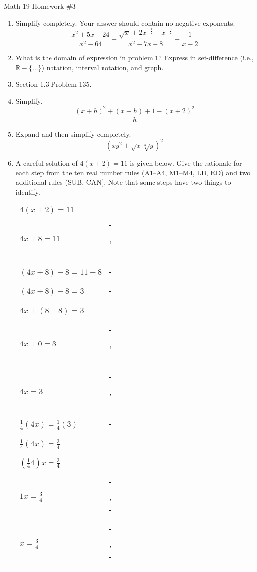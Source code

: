\documentclass[letterpaper,12pt,fleqn]{article}
\begin{document}
\begin{center}
\Large Math-19 Homework \#3
\end{center}

\vspace{0.5in}

\begin{enumerate}
\item Simplify completely.  Your answer should contain no negative exponents.
\[\frac{x^2+5x-24}{x^2-64}-
    \frac{\sqrt{x}+2x^{-\frac{1}{2}}+x^{-\frac{3}{2}}}{x^2-7x-8}+
    \frac{1}{x-2}\]

\item What is the domain of expression in problem 1? Express in set-difference
(i.e., $\mathbb{R}-\{\ldots\}$) notation, interval notation, and graph.

\item Section 1.3 Problem 135.

\item Simplify.
\[\frac{(x+h)^2+(x+h)+1-(x+2)^2}{h}\]

\item Expand and then simplify completely.
\[\left(xy^2+\sqrt{x}\sqrt[3]{y}\right)^2\]

\item A careful solution of $4(x+2)=11$ is given below. Give the rationale for
each step from the ten real number rules (A1--A4, M1--M4, LD, RD) and two
additional rules (SUB, CAN).  Note that some steps have two things to identify.

\newcommand{\fillin}{\rule{1in}{1pt}}

\begin{tabular}{ll}
$4(x+2)=11$ & \\
$4x+8=11$ & \fillin, \fillin \\
$(4x+8)-8=11-8$ & \fillin \\
$(4x+8)-8=3$ & \fillin \\
$4x+(8-8)=3$ & \fillin \\
$4x+0=3$ & \fillin, \fillin \\
$4x=3$ & \fillin, \fillin \\
$\frac{1}{4}(4x)=\frac{1}{4}(3)$ & \fillin \\
$\frac{1}{4}(4x)=\frac{3}{4}$ & \fillin \\
$(\frac{1}{4}4)x=\frac{3}{4}$ & \fillin \\
$1x=\frac{3}{4}$ & \fillin, \fillin \\
$x=\frac{3}{4}$ & \fillin, \fillin \\
\end{tabular}


\end{enumerate}
\end{document}
